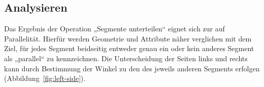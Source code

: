 \documentclass[../main/thesis.tex]{subfiles}
\begin{document}



\subsection{Analysieren}
\label{ch:analyse-algorithm}

Das Ergebnis der Operation „Segmente unterteilen“ eignet sich zur  auf Parallelität.
Hierfür werden Geometrie und Attribute näher verglichen mit dem Ziel, für jedes Segment beidseitig entweder genau ein oder kein anderes Segment als „parallel“ zu kennzeichnen.
%
Die Unterscheidung der Seiten links und rechts kann durch Bestimmung der Winkel zu den  des jeweils anderen Segments erfolgen (Abbildung~\ref{fig:left-side}).
\end{document}
